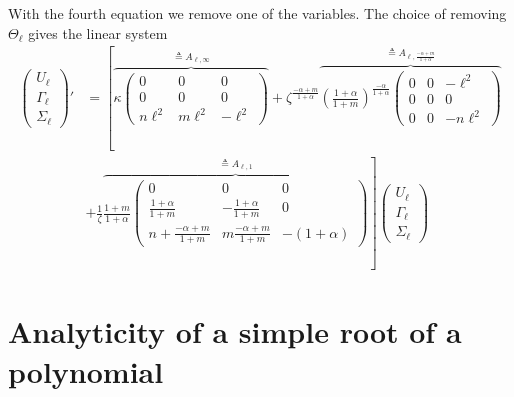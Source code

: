 \documentclass[a4paper,11pt]{article}
\def\l{{\ell}}
\theoremstyle{remark}
\begin{document}
{With the fourth equation we remove one of the variables. The choice of removing $\Theta_\ell$ gives the linear system
\begin{equation} \label{eq:l-system_heat2}
\begin{aligned}
  \begin{pmatrix} U_\ell\\ \Gamma_\ell \\ \Sigma_\ell \end{pmatrix}'
  &= \left[\overbrace{\kappa\begin{pmatrix}
   0 & 0 & 0\\
   0 & 0 & 0\\
   n\l^2 & m\l^2 & -\l^2
  \end{pmatrix} }^{\triangleq A_{\ell,\infty}}
  + \zeta^{\tfrac{-\alpha+m}{1+\alpha}}
  \overbrace{\left(\frac{1+\alpha}{1+m}\right)^{\frac{-\alpha}{1+\alpha}}\begin{pmatrix}
   0 & 0 & -\l^2\\
   0 & 0 & 0\\
   0 & 0 & -n\l^2
 \end{pmatrix} }^{\triangleq A_{\ell,\frac{-\alpha+m}{1+\alpha}}}\right.\\
  &+  \left.  \frac{1}{\zeta}\overbrace{\frac{1+m}{1+\alpha}
  \begin{pmatrix}
   0 & 0 & 0\\
   \frac{1+\alpha}{1+m} & -\frac{1+\alpha}{1+m} & 0\\
   n+ \frac{-\alpha+m}{1+m} & m\frac{-\alpha+m}{1+m}& -(1+\alpha)
  \end{pmatrix} }^{\triangleq A_{\ell,1}}\right] \begin{pmatrix} U_\ell\\ \Gamma_\ell \\ \Sigma_\ell \end{pmatrix}
\end{aligned}
\end{equation}

\pagebreak
\appendix
\renewcommand\thetheorem{\Alph{theorem}}
\setcounter{theorem}{\thetmp}
\section{Analyticity of a simple root of a polynomial}



}
\end{document}
